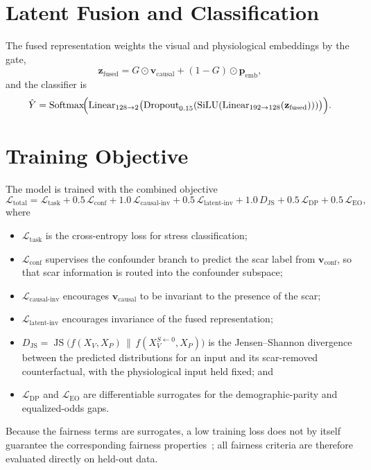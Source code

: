\section{Latent Fusion and Classification}
The fused representation weights the visual and physiological embeddings by the gate,
\begin{equation}
\mathbf{z}_{\text{fused}} = G \odot \mathbf{v}_{\text{causal}} + (1 - G) \odot \mathbf{p}_{\text{emb}},
\end{equation}
and the classifier is
\begin{equation}
\hat{Y} = \operatorname{Softmax}\!\Bigl(\operatorname{Linear}_{128 \to 2}\bigl(\operatorname{Dropout}_{0.15}(\operatorname{SiLU}(\operatorname{Linear}_{192 \to 128}(\mathbf{z}_{\text{fused}})))\bigr)\Bigr).
\end{equation}

\section{Training Objective}
\label{sec:loss}
The model is trained with the combined objective
\begin{equation}
\mathcal{L}_{\text{total}} = \mathcal{L}_{\text{task}} + 0.5\,\mathcal{L}_{\text{conf}} + 1.0\,\mathcal{L}_{\text{causal-inv}} + 0.5\,\mathcal{L}_{\text{latent-inv}} + 1.0\,D_{\text{JS}} + 0.5\,\mathcal{L}_{\text{DP}} + 0.5\,\mathcal{L}_{\text{EO}},
\end{equation}
where
\begin{itemize}
    \item $\mathcal{L}_{\text{task}}$ is the cross-entropy loss for stress classification;
    \item $\mathcal{L}_{\text{conf}}$ supervises the confounder branch to predict the scar label from $\mathbf{v}_{\text{conf}}$, so that scar information is routed into the confounder subspace;
    \item $\mathcal{L}_{\text{causal-inv}}$ encourages $\mathbf{v}_{\text{causal}}$ to be invariant to the presence of the scar;
    \item $\mathcal{L}_{\text{latent-inv}}$ encourages invariance of the fused representation;
    \item $D_{\text{JS}} = \operatorname{JS}\bigl(f(X_V, X_P) \,\|\, f(X_V^{S \leftarrow 0}, X_P)\bigr)$ is the Jensen--Shannon divergence between the predicted distributions for an input and its scar-removed counterfactual, with the physiological input held fixed; and
    \item $\mathcal{L}_{\text{DP}}$ and $\mathcal{L}_{\text{EO}}$ are differentiable surrogates for the demographic-parity and equalized-odds gaps.
\end{itemize}
Because the fairness terms are surrogates, a low training loss does not by itself guarantee the corresponding fairness properties~\cite{yao2024}; all fairness criteria are therefore evaluated directly on held-out data.

